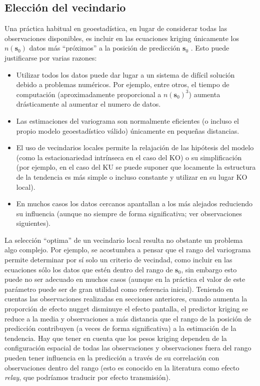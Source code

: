 \documentclass[
]{book}
\providecommand{\tightlist}{%
  \setlength{\itemsep}{0pt}\setlength{\parskip}{0pt}}
\theoremstyle{break}
\theoremstyle{definition}
\theoremstyle{definition}
\theoremstyle{definition}
\theoremstyle{definition}
\theoremstyle{remark}
\begin{document}
\subsection{Elección del vecindario}\label{eleccion-vecindario}

Una práctica habitual en geoestadística, en lugar de considerar todas las observaciones disponibles, es incluir en las ecuaciones kriging únicamente los \(n(\mathbf{s}_{0})\) datos más ``próximos'' a la posición de predicción \(\mathbf{s}_{0}\) .
Esto puede justificarse por varias razones:

\begin{itemize}
\tightlist
\item
  Utilizar todos los datos puede dar lugar a un sistema de difícil solución debido a problemas numéricos. Por ejemplo, entre otros, el tiempo de computación (aproximadamente proporcional a \(n(\mathbf{s}_{0})^{3}\)) aumenta drásticamente al aumentar el numero de datos.
\item
  Las estimaciones del variograma son normalmente eficientes (o incluso el propio modelo geoestadístico válido) únicamente en pequeñas distancias.
\item
  El uso de vecindarios locales permite la relajación de las hipótesis del modelo (como la estacionariedad intrínseca en el caso del KO) o su simplificación (por ejemplo, en el caso del KU se puede suponer que locamente la estructura de la tendencia es más simple o incluso constante y utilizar en su lugar KO local).
\item
  En muchos casos los datos cercanos apantallan a los más alejados
  reduciendo su influencia (aunque no siempre de forma significativa; ver
  observaciones siguientes).
\end{itemize}

La selección ``optima'' de un vecindario local resulta no obstante un problema algo complejo. Por ejemplo, se acostumbra a pensar que el rango del variograma permite determinar por sí solo un criterio de vecindad, como incluir en las ecuaciones sólo los datos que estén dentro del rango de \(\mathbf{s}_{0}\), sin embargo esto puede no ser adecuado en muchos casos (aunque en la práctica el valor de este parámetro puede ser de gran utilidad como referencia inicial).
Teniendo en cuentas las observaciones realizadas en secciones anteriores, cuando aumenta la proporción de efecto nugget disminuye el efecto pantalla, el predictor kriging se reduce a la media y observaciones a más distancia que el rango de la posición de predicción contribuyen (a veces de forma significativa) a la estimación de la tendencia.
Hay que tener en cuenta que los pesos kriging dependen de la configuración espacial de todas las observaciones y observaciones fuera del rango pueden tener influencia en la predicción a través de su correlación con observaciones dentro del rango (esto es conocido en la literatura como efecto \emph{relay}, que podríamos traducir por efecto transmisión).
\end{document}
